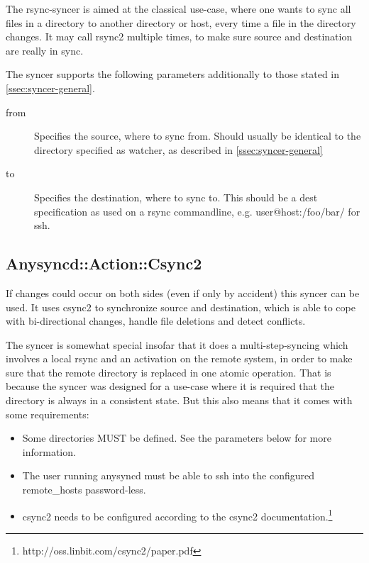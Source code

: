 The rsync-syncer is aimed at the classical use-case, where one wants to sync
all files in a directory to another directory or host, every time a file in the
directory changes. It may call rsync2 multiple times, to make sure source
and destination are really in sync.

The syncer supports the following parameters additionally to those
stated in \ref{ssec:syncer-general}.

\begin{description}
    \item[from] Specifies the source, where to sync from. Should usually be
        identical to the directory specified as watcher, as described in
        \ref{ssec:syncer-general}

    \item[to] Specifies the destination, where to sync to. This should be a
        dest specification as used on a rsync commandline, e.g.
        user@host:/foo/bar/ for ssh.
\end{description}

\subsection{Anysyncd::Action::Csync2}

If changes could occur on both sides (even if only by accident) this syncer
can be used. It uses csync2 to synchronize source and destination, which is
able to cope with bi-directional changes, handle file deletions and detect
conflicts. 

The syncer is somewhat special insofar that it does a multi-step-syncing
which involves a local rsync and an activation on the remote system, in order to
make sure that the remote directory is replaced in one atomic operation. That
is because the syncer was designed for a use-case where it is required that the
directory is always in a consistent state. But this also means that it comes
with some requirements:

\begin{itemize}
    \item Some directories MUST be defined. See the parameters below for more
        information.
    \item The user running anysyncd must be able to ssh into the configured
        remote_hosts password-less.
    \item csync2 needs to be configured according to the csync2
        documentation.\footnote{http://oss.linbit.com/csync2/paper.pdf} 
\end{itemize}

